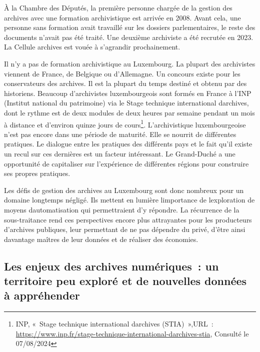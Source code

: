 À la Chambre des Députés, la première personne
chargée de la gestion des archives avec une formation archivistique est arrivée en
2008. Avant cela, une personne sans formation avait travaillé sur les
dossiers parlementaires, le reste des documents n'avait pas été traité.
Une deuxième archiviste a été recrutée en 2023. La Cellule archives est
vouée à s'agrandir prochainement. 

Il n'y a pas de formation
archivistique au Luxembourg. La plupart des archivistes viennent de
France, de Belgique ou d'Allemagne. Un concours existe pour les
conservateurs des archives. Il est la plupart du temps destiné et
obtenu par des historiens. Beaucoup d'archivistes luxembourgeois sont
formés en France à l'INP (Institut national du patrimoine) via le Stage
technique international d\textquotesingle archives, dont le rythme est
de deux modules de deux heures par semaine pendant un mois à distance et
d'environ quinze jours de cours\footnote{INP, «~Stage technique
	international d\textquotesingle archives (STIA)~»,URL~:
	\url{https://www.inp.fr/stage-technique-international-darchives-stia},
	Consulté le 07/08/2024}. L'archivistique luxembourgeoise n'est pas
encore dans une période de maturité. Elle se nourrit de différentes
pratiques. Le dialogue entre les pratiques des différents pays et le
fait qu'il existe un recul sur ces dernières est un facteur intéressant.
Le Grand-Duché a une opportunité de capitaliser sur l'expérience de
différentes régions pour construire ses propres pratiques. 
\newline

Les défis de gestion des archives au Luxembourg sont donc nombreux
pour un domaine longtemps négligé. Ils mettent en lumière
l\textquotesingle importance de l\textquotesingle exploration de moyens
d\textquotesingle automatisation qui permettraient d'y répondre. La récurrence de la sous-traitance rend ces perspectives encore plus attrayantes
pour les producteurs d'archives publiques, leur permettant de ne pas
dépendre du privé, d'être ainsi davantage maîtres de leur données et
de réaliser des économies.



\subsection{Les enjeux des archives numériques~: un territoire peu exploré et de nouvelles données à appréhender}

